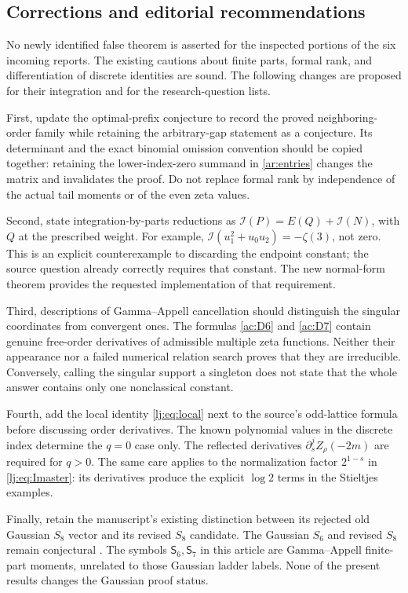 \documentclass[11pt,a4paper]{article}
\numberwithin{equation}{section}
\theoremstyle{definition}
\theoremstyle{remark}
\newcommand{\cI}{\mathcal I}
\begin{document}
\subsection{Corrections and editorial recommendations}

No newly identified false theorem is asserted for the inspected portions
of the six incoming reports. The existing cautions about finite parts,
formal rank, and differentiation of discrete identities are sound.
The following changes are proposed for their integration and for the
research-question lists.

First, update the optimal-prefix conjecture to record the proved
neighboring-order family while retaining the arbitrary-gap statement as a
conjecture. Its determinant and the exact binomial omission convention
should be copied together: retaining the lower-index-zero summand in
\eqref{ar:entries} changes the matrix and invalidates the proof.
Do not replace formal rank by independence of the actual tail
moments or of the even zeta values.

Second, state integration-by-parts reductions as
$\cI(P)=E(Q)+\cI(N)$, with $Q$ at the prescribed weight. For example,
$\cI(u_1^2+u_0u_2)=-\zeta(3)$, not zero. This is an explicit
counterexample to discarding the endpoint constant; the source question
already correctly requires that constant. The new normal-form theorem
provides the requested implementation of that requirement.

Third, descriptions of Gamma--Appell cancellation should distinguish the
singular coordinates from convergent ones. The formulas
\eqref{ac:D6} and \eqref{ac:D7} contain genuine free-order derivatives
of admissible multiple zeta functions. Neither their appearance nor a
failed numerical relation search proves that they are irreducible.
Conversely, calling the singular support a singleton does not state
that the whole answer contains only one nonclassical constant.

Fourth, add the local identity \eqref{lj:eq:local} next to the source's
odd-lattice formula before discussing order derivatives. The known
polynomial values in the discrete index determine the $q=0$ case only.
The reflected derivatives $\partial_s^jZ_\rho(-2m)$ are required for
$q>0$. The same care applies to the normalization factor $2^{1-s}$
in \eqref{lj:eq:Imaster}: its derivatives produce the explicit
$\log 2$ terms in the Stieltjes examples.

Finally, retain the manuscript's existing distinction between its
rejected old Gaussian $S_8$ vector and its revised $S_8$ candidate.
The Gaussian $S_6$ and revised $S_8$ remain conjectural
\cite{Repo}. The symbols $\mathsf S_6,\mathsf S_7$ in this article
are Gamma--Appell finite-part moments, unrelated to those Gaussian
ladder labels. None of the present results changes the Gaussian
proof status.
\end{document}
